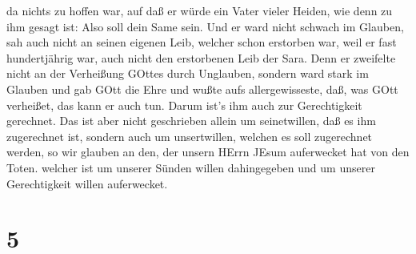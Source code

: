 da nichts zu hoffen war, auf daß er würde ein Vater vieler Heiden, wie
denn zu ihm gesagt ist: Also soll dein Same sein.  Und er
ward nicht schwach im Glauben, sah auch nicht an seinen eigenen Leib,
welcher schon erstorben war, weil er fast hundertjährig war, auch nicht
den erstorbenen Leib der Sara.  Denn er zweifelte nicht an
der Verheißung GOttes durch Unglauben, sondern ward stark im Glauben und
gab GOtt die Ehre  und wußte aufs allergewisseste, daß, was
GOtt verheißet, das kann er auch tun.  Darum ist's ihm auch
zur Gerechtigkeit gerechnet.  Das ist aber nicht
geschrieben allein um seinetwillen, daß es ihm zugerechnet ist,
 sondern auch um unsertwillen, welchen es soll zugerechnet
werden, so wir glauben an den, der unsern HErrn JEsum auferwecket hat
von den Toten.  welcher ist um unserer Sünden willen
dahingegeben und um unserer Gerechtigkeit willen auferwecket.

\hypertarget{section-4}{%
\section{5}\label{section-4}}


